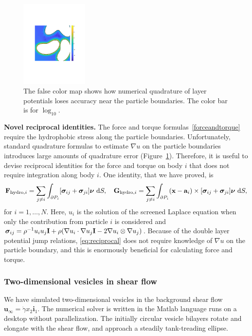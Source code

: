 \begin{figure}
\centerline{\includegraphics[width=0.30\textwidth]{figures/BIError.pdf}}
  \vspace{-8pt}
\caption{
\label{fig:bierror}  
\footnotesize The false color map shows how numerical quadrature of
  layer potentials loses accuracy near the particle boundaries.  The
  color bar is for $\log_{10}.$}
\end{figure}
\textbf{Novel reciprocal identities.} 
The force and torque formulas~\eqref{forceandtorque} require the
hydrophobic stress along the particle boundaries. Unfortunately,
standard quadrature formulas to estimate $\nabla u$ on the particle
boundaries introduces large amounts of quadrature error
(Figure~\ref{fig:bierror}). Therefore, it is useful to devise reciprocal
identities for the force and torque on body $i$ that does not
require integration along body $i$. One identity, that we have proved,
is
\begin{align}
    \label{eq:reciprocal}
{\bf F}_{\text{hydro},i} = \sum_{j \neq i} \int_{\partial P_i}
[\boldsymbol{\sigma}_{ij} + \boldsymbol{\sigma}_{ji}]\boldsymbol{\nu}\,\dif S,\quad
{\bf G}_{\text{hydro},i} = \sum_{j \neq i} \int_{\partial P_i} ({\bf
  x}-\mathbf{a}_i) \times [\boldsymbol{\sigma}_{ij} +
  \boldsymbol{\sigma}_{ji}]\boldsymbol{\nu}\,\dif S, 
\end{align}
for $i=1,\ldots,N$. Here, $u_i$ is the solution of the screened Laplace
equation when only the contribution from particle $i$ is considered and
$\boldsymbol{\sigma}_{ij} = \rho^{-1} u_iu_j {\bf I} + \rho(\nabla u_i
\cdot \nabla u_j {\bf I} - 2 \nabla u_i \otimes \nabla u_j)$.
Because of the double layer potential jump relations, \eqref{eq:reciprocal} 
does not require knowledge of $\nabla u$ on the particle boundary, and this
is enormously beneficial for calculating force and torque.

\subsubsection{Two-dimensional vesicles in shear flow}
We have simulated two-dimensional vesicles in the background shear flow
$\mathbf{u}_{\infty} = \dot{\gamma} x_2 \mathbf{i}_1$. The numerical solver
is written in the Matlab language runs on a desktop without parallelization. 
The initially circular vesicle bilayers rotate and elongate with the shear flow, 
and approach a steadily tank-treading ellipse.

